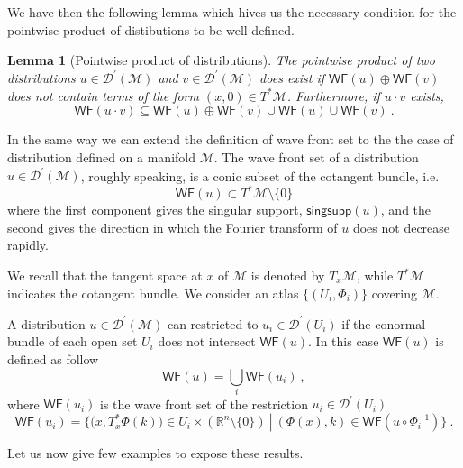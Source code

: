 \documentclass[11pt]{book}
\newcommand{\singsupp}{\mathsf{singsupp}}
\newcommand{\WF}{\mathsf{WF}}
\newcommand{\Dcal}{\mathcal{D}}
\newcommand{\Mcal}{\mathcal{M}}
\newcommand{\Rbb}{\mathbb{R}}
\theoremstyle{break}
\newtheorem{lemma}{Lemma}[chapter]
\begin{document}
We have then the following lemma which hives us the necessary condition for the pointwise product of distibutions to be well defined.


\begin{lemma}[Pointwise product of distributions]\label{lem:prod_distrib_wf}
The pointwise product of two distributions $u\in\Dcal^\prime(\Mcal)$ and $v\in\Dcal^\prime(\Mcal)$ does exist if $\WF(u) \oplus \WF(v)$ does not contain terms of the form $(x,0) \in T^\ast\Mcal$. Furthermore, if $u\cdot v$ exists, 
\begin{equation*}
\WF(u \cdot v) \subseteq \WF(u) \oplus \WF(v) \cup \WF(u) \cup \WF(v) \ . 
\end{equation*} 
%
\end{lemma}


In the same way we can extend the definition of wave front set to the the case of distribution defined on a manifold $\Mcal$. The wave front set of a distribution $u \in \Dcal^\prime(\Mcal)$, roughly speaking, is a conic subset of the cotangent bundle, i.e.
%
\begin{equation}
\WF(u) \subset T^\ast\Mcal\setminus\{0\} 
\end{equation}
%
where the first component gives the singular support, $\singsupp(u)$, and the second gives the direction in which the Fourier transform of $u$ does not decrease rapidly. 


We recall that the tangent space at $x$ of $\Mcal$ is denoted by $T_x\Mcal$, while $T^\ast \Mcal$ indicates the cotangent bundle. We consider an atlas $\{(U_i,\Phi_i)\}$ covering $\Mcal$. 


A distribution $u\in \Dcal^\prime(\Mcal)$ can restricted to $u_i \in \Dcal^\prime(U_i)$ if the conormal bundle of each open set $U_i$ does not intersect $\WF(u)$. In this case $\WF(u)$ is defined as follow 
%
\begin{equation*}
\WF(u) = \bigcup_i \WF(u_i) \ ,
\end{equation*}
%
where $\WF(u_i)$ is the wave front set of the restriction $u_i \in \Dcal^\prime(U_i)$
%
\begin{equation*}
\WF(u_i) = \bigg\{ \bigg( x, T_x^\ast\Phi(k) \bigg) \in U_i \times \left( \Rbb^n \setminus \{0\} \right) \ \left| \ \left( \Phi(x) , k \right) \in \WF\left( u \circ \Phi_i^{-1} \right) \bigg\} \ . \right.
\end{equation*}


Let us now give few examples to expose these results. 
\end{document}
